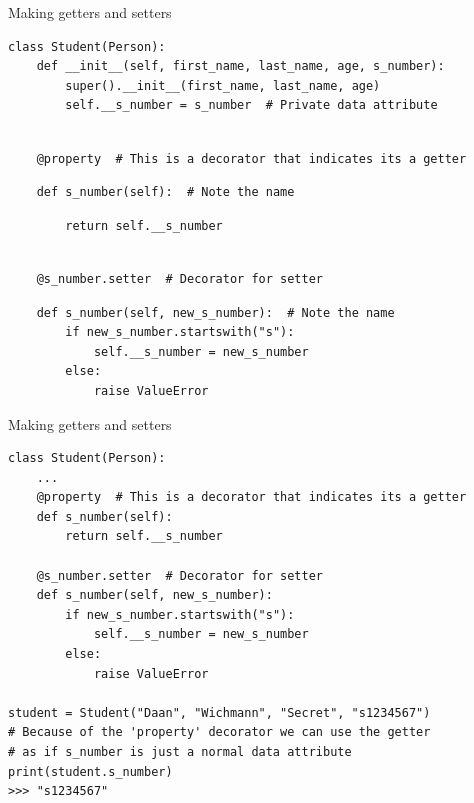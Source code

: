 \begin{frame}[fragile]{Making getters and setters}
\begin{verbatim}
class Student(Person):
    def __init__(self, first_name, last_name, age, s_number):
        super().__init__(first_name, last_name, age)
        self.__s_number = s_number  # Private data attribute
\end{verbatim}
\pause
\begin{verbatim}
    
    @property  # This is a decorator that indicates its a getter
\end{verbatim}
\pause
\begin{verbatim}
    def s_number(self):  # Note the name
\end{verbatim}
\pause
\begin{verbatim}
        return self.__s_number
\end{verbatim}
\pause
\begin{verbatim}

    @s_number.setter  # Decorator for setter
\end{verbatim}
\pause
\begin{verbatim}
    def s_number(self, new_s_number):  # Note the name
        if new_s_number.startswith("s"):
            self.__s_number = new_s_number
        else:
            raise ValueError
\end{verbatim}
\end{frame}

\begin{frame}[fragile]{Making getters and setters}
\begin{verbatim}
class Student(Person):
    ...
    @property  # This is a decorator that indicates its a getter
    def s_number(self):
        return self.__s_number

    @s_number.setter  # Decorator for setter
    def s_number(self, new_s_number):
        if new_s_number.startswith("s"):
            self.__s_number = new_s_number
        else:
            raise ValueError

student = Student("Daan", "Wichmann", "Secret", "s1234567")
# Because of the 'property' decorator we can use the getter
# as if s_number is just a normal data attribute
print(student.s_number)
>>> "s1234567"
\end{verbatim}
\end{frame}


